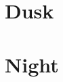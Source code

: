 \documentclass[10pt,letterpaper]{article}
\begin{document}
\section{Dusk}
\lipsum[1-8]
\section{Night}
\limencaustic[1.5]
\lipsum[9-16]
\end{document}
